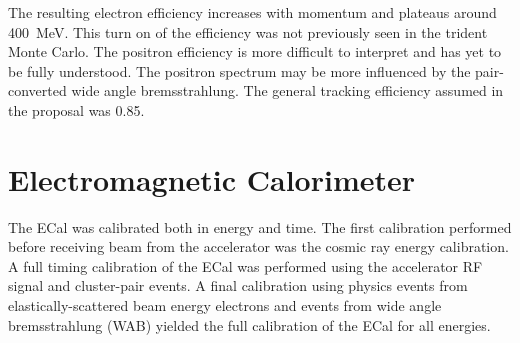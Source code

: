 The resulting electron efficiency increases with momentum and plateaus around 400~MeV. This turn on of the efficiency was not previously seen in the trident Monte Carlo. The positron efficiency is more difficult to interpret and has yet to be fully understood. The positron spectrum may be more influenced by the pair-converted wide angle bremsstrahlung. The general tracking efficiency assumed in the proposal was 0.85. 

\section{Electromagnetic Calorimeter}
The ECal was calibrated both in energy and time. The first calibration performed before receiving beam from the accelerator was the cosmic ray energy calibration. A full timing calibration of the ECal was performed using the accelerator RF signal and cluster-pair events. A final calibration using physics events from elastically-scattered beam energy electrons and events from wide angle bremsstrahlung (WAB) yielded the full calibration of the ECal for all energies.  

